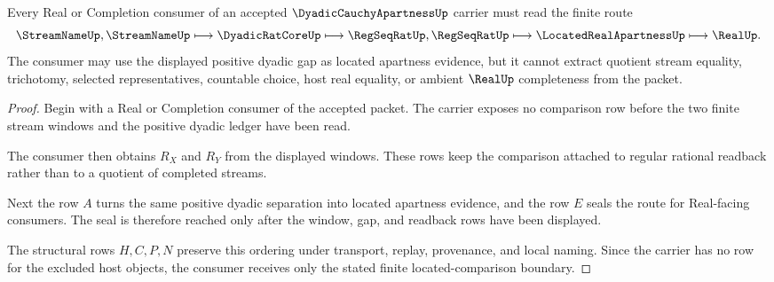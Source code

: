 \begin{theorem}
\label{thm:dyadic-cauchy-apartness-located-comparison-boundary}
Every Real or Completion consumer of an accepted $\DyadicCauchyApartnessUp$ carrier must read the finite route
$$
\StreamNameUp,\StreamNameUp \longmapsto \DyadicRatCoreUp \longmapsto \RegSeqRatUp,\RegSeqRatUp \longmapsto \LocatedRealApartnessUp \longmapsto \RealUp .
$$
The consumer may use the displayed positive dyadic gap as located apartness evidence, but it cannot extract quotient stream equality, trichotomy, selected representatives, countable choice, host real equality, or ambient $\RealUp$ completeness from the packet.
\end{theorem}
\begin{proof}
Begin with a Real or Completion consumer of the accepted packet. The carrier exposes no comparison row before the two finite stream windows and the positive dyadic ledger have been read.

The consumer then obtains $R_X$ and $R_Y$ from the displayed windows. These rows keep the comparison attached to regular rational readback rather than to a quotient of completed streams.

Next the row $A$ turns the same positive dyadic separation into located apartness evidence, and the row $E$ seals the route for Real-facing consumers. The seal is therefore reached only after the window, gap, and readback rows have been displayed.

The structural rows $H,C,P,N$ preserve this ordering under transport, replay, provenance, and local naming. Since the carrier has no row for the excluded host objects, the consumer receives only the stated finite located-comparison boundary.
\end{proof}

